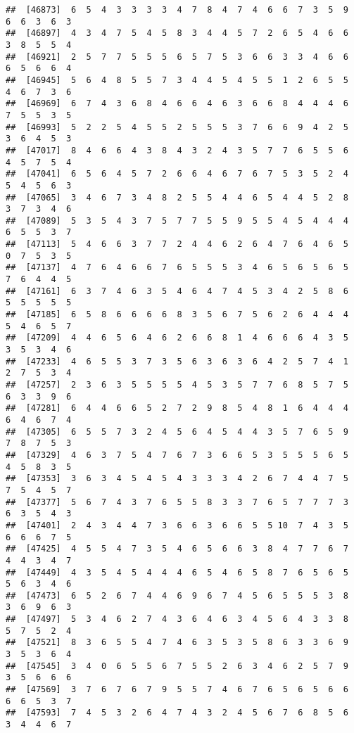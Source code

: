 \documentclass[
]{book}
\begin{document}
\begin{verbatim}
##  [46873]  6  5  4  3  3  3  3  4  7  8  4  7  4  6  6  7  3  5  9  6  6  3  6  3
##  [46897]  4  3  4  7  5  4  5  8  3  4  4  5  7  2  6  5  4  6  6  3  8  5  5  4
##  [46921]  2  5  7  7  5  5  5  6  5  7  5  3  6  6  3  3  4  6  6  6  5  6  6  4
##  [46945]  5  6  4  8  5  5  7  3  4  4  5  4  5  5  1  2  6  5  5  4  6  7  3  6
##  [46969]  6  7  4  3  6  8  4  6  6  4  6  3  6  6  8  4  4  4  6  7  5  5  3  5
##  [46993]  5  2  2  5  4  5  5  2  5  5  5  3  7  6  6  9  4  2  5  3  6  4  5  3
##  [47017]  8  4  6  6  4  3  8  4  3  2  4  3  5  7  7  6  5  5  6  4  5  7  5  4
##  [47041]  6  5  6  4  5  7  2  6  6  4  6  7  6  7  5  3  5  2  4  5  4  5  6  3
##  [47065]  3  4  6  7  3  4  8  2  5  5  4  4  6  5  4  4  5  2  8  3  7  3  4  6
##  [47089]  5  3  5  4  3  7  5  7  7  5  5  9  5  5  4  5  4  4  4  6  5  5  3  7
##  [47113]  5  4  6  6  3  7  7  2  4  4  6  2  6  4  7  6  4  6  5  0  7  5  3  5
##  [47137]  4  7  6  4  6  6  7  6  5  5  5  3  4  6  5  6  5  6  5  7  6  4  4  5
##  [47161]  6  3  7  4  6  3  5  4  6  4  7  4  5  3  4  2  5  8  6  5  5  5  5  5
##  [47185]  6  5  8  6  6  6  6  8  3  5  6  7  5  6  2  6  4  4  4  5  4  6  5  7
##  [47209]  4  4  6  5  6  4  6  2  6  6  8  1  4  6  6  6  4  3  5  3  5  3  4  6
##  [47233]  4  6  5  5  3  7  3  5  6  3  6  3  6  4  2  5  7  4  1  2  7  5  3  4
##  [47257]  2  3  6  3  5  5  5  5  4  5  3  5  7  7  6  8  5  7  5  6  3  3  9  6
##  [47281]  6  4  4  6  6  5  2  7  2  9  8  5  4  8  1  6  4  4  4  6  4  6  7  4
##  [47305]  6  5  5  7  3  2  4  5  6  4  5  4  4  3  5  7  6  5  9  7  8  7  5  3
##  [47329]  4  6  3  7  5  4  7  6  7  3  6  6  5  3  5  5  5  6  5  4  5  8  3  5
##  [47353]  3  6  3  4  5  4  5  4  3  3  3  4  2  6  7  4  4  7  5  7  5  4  5  7
##  [47377]  5  6  7  4  3  7  6  5  5  8  3  3  7  6  5  7  7  7  3  6  3  5  4  3
##  [47401]  2  4  3  4  4  7  3  6  6  3  6  6  5  5 10  7  4  3  5  6  6  6  7  5
##  [47425]  4  5  5  4  7  3  5  4  6  5  6  6  3  8  4  7  7  6  7  4  4  3  4  7
##  [47449]  4  3  5  4  5  4  4  4  6  5  4  6  5  8  7  6  5  6  5  5  6  3  4  6
##  [47473]  6  5  2  6  7  4  4  6  9  6  7  4  5  6  5  5  5  3  8  3  6  9  6  3
##  [47497]  5  3  4  6  2  7  4  3  6  4  6  3  4  5  6  4  3  3  8  5  7  5  2  4
##  [47521]  8  3  6  5  5  4  7  4  6  3  5  3  5  8  6  3  3  6  9  3  5  3  6  4
##  [47545]  3  4  0  6  5  5  6  7  5  5  2  6  3  4  6  2  5  7  9  3  5  6  6  6
##  [47569]  3  7  6  7  6  7  9  5  5  7  4  6  7  6  5  6  5  6  6  6  6  5  3  7
##  [47593]  7  4  5  3  2  6  4  7  4  3  2  4  5  6  7  6  8  5  6  3  4  4  6  7

\end{verbatim}
\end{document}
